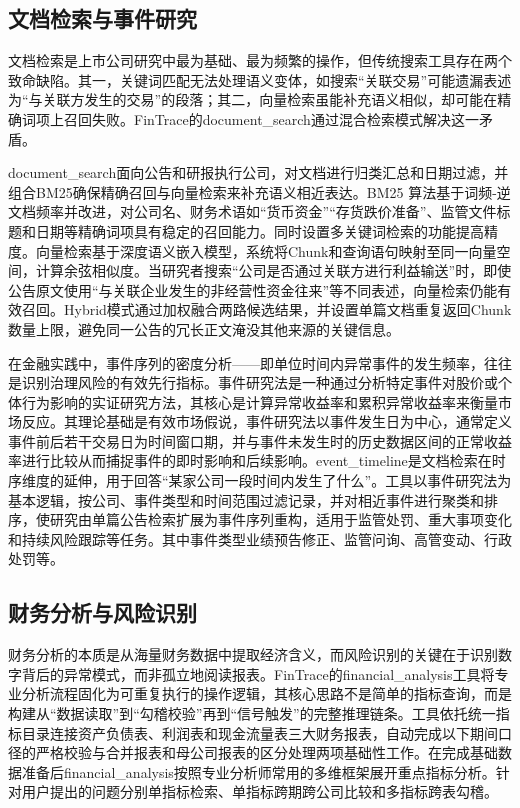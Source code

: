 \subsection{文档检索与事件研究}

文档检索是上市公司研究中最为基础、最为频繁的操作，但传统搜索工具存在两个致命缺陷。其一，关键词匹配无法处理语义变体，如搜索“关联交易”可能遗漏表述为“与关联方发生的交易”的段落；其二，向量检索虽能补充语义相似，却可能在精确词项上召回失败。FinTrace的document\_search通过混合检索模式解决这一矛盾。

document\_search面向公告和研报执行公司，对文档进行归类汇总和日期过滤，并组合BM25确保精确召回与向量检索来补充语义相近表达。BM25 算法基于词频-逆文档频率并改进，对公司名、财务术语如“货币资金”“存货跌价准备”、监管文件标题和日期等精确词项具有稳定的召回能力。同时设置多关键词检索的功能提高精度。向量检索基于深度语义嵌入模型，系统将Chunk和查询语句映射至同一向量空间，计算余弦相似度。当研究者搜索“公司是否通过关联方进行利益输送”时，即使公告原文使用“与关联企业发生的非经营性资金往来”等不同表述，向量检索仍能有效召回。Hybrid模式通过加权融合两路候选结果，并设置单篇文档重复返回Chunk数量上限，避免同一公告的冗长正文淹没其他来源的关键信息。

在金融实践中，事件序列的密度分析——即单位时间内异常事件的发生频率，往往是识别治理风险的有效先行指标。事件研究法是一种通过分析特定事件对股价或个体行为影响的实证研究方法，其核心是计算异常收益率和累积异常收益率来衡量市场反应。其理论基础是有效市场假说，事件研究法以事件发生日为中心，通常定义事件前后若干交易日为时间窗口期，并与事件未发生时的历史数据区间的正常收益率进行比较从而捕捉事件的即时影响和后续影响。event\_timeline是文档检索在时序维度的延伸，用于回答“某家公司一段时间内发生了什么”。工具以事件研究法为基本逻辑，按公司、事件类型和时间范围过滤记录，并对相近事件进行聚类和排序，使研究由单篇公告检索扩展为事件序列重构，适用于监管处罚、重大事项变化和持续风险跟踪等任务。其中事件类型业绩预告修正、监管问询、高管变动、行政处罚等。

\subsection{财务分析与风险识别}

财务分析的本质是从海量财务数据中提取经济含义，而风险识别的关键在于识别数字背后的异常模式，而非孤立地阅读报表。FinTrace的financial\_analysis工具将专业分析流程固化为可重复执行的操作逻辑，其核心思路不是简单的指标查询，而是构建从“数据读取”到“勾稽校验”再到“信号触发”的完整推理链条。工具依托统一指标目录连接资产负债表、利润表和现金流量表三大财务报表，自动完成以下期间口径的严格校验与合并报表和母公司报表的区分处理两项基础性工作。在完成基础数据准备后financial\_analysis按照专业分析师常用的多维框架展开重点指标分析。针对用户提出的问题分别单指标检索、单指标跨期跨公司比较和多指标跨表勾稽。

